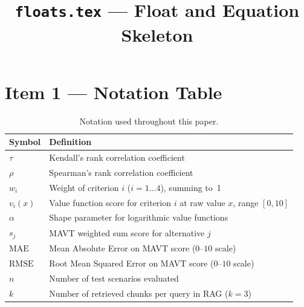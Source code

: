 \documentclass[a4paper,11pt]{article}
\title{\texttt{floats.tex} — Float and Equation Skeleton}
\author{}
\date{}
\begin{document}
\maketitle
\tableofcontents
\newpage


\section*{Item 1 — Notation Table}

\begin{table}[t]
  \centering
  \small
  \caption{Notation used throughout this paper.}
  \label{tab:item1}
  \begin{tabular}{@{}ll@{}}
    \toprule
    Symbol & Definition \\
    \midrule
    $\tau$               & Kendall's rank correlation coefficient \\
    $\rho$               & Spearman's rank correlation coefficient \\
    $w_i$                & Weight of criterion $i$ ($i=1\ldots4$), summing to~1 \\
    $v_i(x)$             & Value function score for criterion $i$ at raw value $x$, range $[0,10]$ \\
    $\alpha$             & Shape parameter for logarithmic value functions \\
    $s_j$                & MAVT weighted sum score for alternative $j$ \\
    $\text{MAE}$         & Mean Absolute Error on MAVT score ($0$--$10$ scale) \\
    $\text{RMSE}$        & Root Mean Squared Error on MAVT score ($0$--$10$ scale) \\
    $n$                  & Number of test scenarios evaluated \\
    $k$                  & Number of retrieved chunks per query in RAG ($k=3$) \\
    \bottomrule
  \end{tabular}
\end{table}

\end{document}
